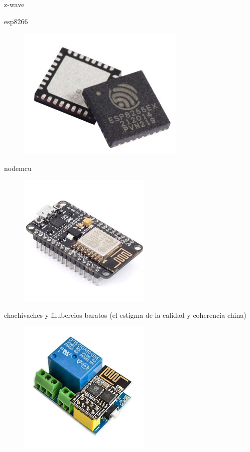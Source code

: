 z-wave


esp8266
\begin{figure}[hbt!]
\centering
\includegraphics[height=2.5in]{figures/esp8266ex.jpg}
\end{figure}


nodemcu
\begin{figure}[hbt!]
\centering
\includegraphics[height=2.5in]{figures/nodemcu.jpg}
\end{figure}

chachivaches y filubercios baratos (el estigma de la calidad y coherencia china)
\begin{figure}[hbt!]
\centering
\includegraphics[height=2.5in]{figures/esp8266exRele.jpg}
\end{figure}

